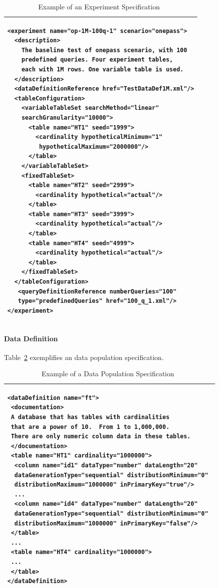 \documentclass[conference]{IEEEtran}
\begin{document}
\begin{table}[htp!]
\begin{center}
{
\scriptsize
\begin{tabular}{|p{8.5cm}|} \hline
\begin{verbatim}
<experiment name="op-1M-100q-1" scenario="onepass">
  <description>
    The baseline test of onepass scenario, with 100 
    predefined queries. Four experiment tables, 
    each with 1M rows. One variable table is used.
  </description>
  <dataDefinitionReference href="TestDataDef1M.xml"/>
  <tableConfiguration>
    <variableTableSet searchMethod="linear" 
    searchGranularity="10000">
      <table name="HT1" seed="1999">
        <cardinality hypotheticalMinimum="1"
         hypotheticalMaximum="2000000"/>
      </table>
    </variableTableSet>
    <fixedTableSet>
      <table name="HT2" seed="2999">
        <cardinality hypothetical="actual"/>
      </table>
      <table name="HT3" seed="3999">
        <cardinality hypothetical="actual"/>
      </table>
      <table name="HT4" seed="4999">
        <cardinality hypothetical="actual"/>
      </table>
    </fixedTableSet>
  </tableConfiguration>
   <queryDefinitionReference numberQueries="100" 
   type="predefinedQueries" href="100_q_1.xml"/>
</experiment>
\end{verbatim}
\\ \hline \end{tabular}
}
\caption{Example of an Experiment Specification~\label{tab:exp_spec}}
\end{center}
\end{table}

\paragraph{Data Definition}
Table~\ref{tab:data_spec} exemplifies an data population specification. 

\begin{table}[htp!]
\begin{center}
{
\scriptsize
\begin{tabular}{|p{8.5cm}|} \hline
\begin{verbatim}
<dataDefinition name="ft">
 <documentation>
 A database that has tables with cardinalities 
 that are a power of 10.  From 1 to 1,000,000.  
 There are only numeric column data in these tables.
 </documentation>
 <table name="HT1" cardinality="1000000">
  <column name="id1" dataType="number" dataLength="20" 
  dataGenerationType="sequential" distributionMinimum="0" 
  distributionMaximum="1000000" inPrimaryKey="true"/>
  ...
  <column name="id4" dataType="number" dataLength="20" 
  dataGenerationType="sequential" distributionMinimum="0" 
  distributionMaximum="1000000" inPrimaryKey="false"/>
 </table>
 ...
 <table name="HT4" cardinality="1000000">
 ...
 </table>
</dataDefinition>
\end{verbatim}
\\ \hline \end{tabular}
}
\caption{Example of a Data Population Specification~\label{tab:data_spec}}
\end{center}
\end{table}
\end{document}
